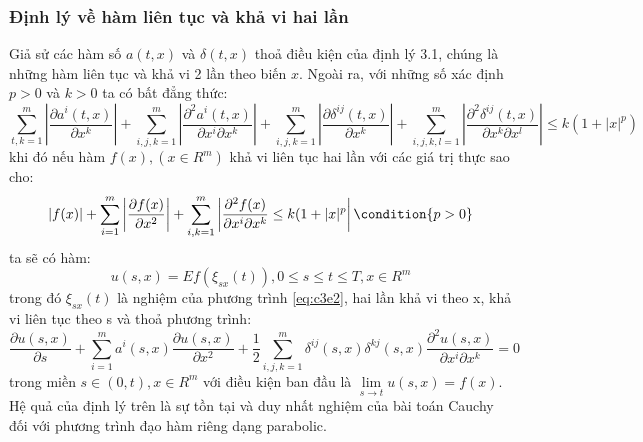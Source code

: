 \documentclass[a4paper]{article}
\numberwithin{equation}{section}
\begin{document}
\subsubsection{Định lý về hàm liên tục và khả vi hai lần}
Giả sử các hàm số $a(t,x)$ và $\delta(t,x)$ thoả điều kiện của định lý 3.1, chúng là những hàm liên tục và khả vi 2 lần theo biến $x$. Ngoài ra, với những số xác định $p>0$ và $k>0$ ta có bất đẳng thức:
\begin{dmath*}
	\sum\limits_{t,k=1}^{m}\left|\dfrac{\partial a^i(t,x)}{\partial x^k}\right|+\sum\limits_{i,j,k=1}^{m}\left|\dfrac{\partial^2a^i(t,x)}{\partial x^i\partial x^k}\right|+\sum_{i,j,k=1}^{m}\left|\dfrac{\partial\delta^{ij}(t,x)}{\partial x^k} \right|+\sum_{i,j,k,l=1}^{m}\left|\dfrac{\partial^2\delta^{ij}(t,x)}{\partial x^k\partial x^l} \right|\leq k(1+|x|^p)	
\end{dmath*}
khi đó nếu hàm $f(x),(x\in R^m)$ khả vi liên tục hai lần với các giá trị thực sao cho:
\begin{equation*}
	\left|f(x)\right|+\sum_{i=1}^{m}\left|\dfrac{\partial f(x)}{\partial x^2} \right|+\sum_{i,k=1}^{m}\left|\dfrac{\partial^2f(x)}{\partial x^i \partial x^k}\leq k(1+|x|^p \right| \condition{p>0}
\end{equation*}
ta sẽ có hàm:
\begin{equation*}
	u(s,x)=Ef(\xi_{sx}(t)),0\leq s\leq t \leq T,x\in R^m
\end{equation*}
trong đó $\xi_{sx}(t)$ là nghiệm của phương trình \eqref{eq:c3e2}, hai lần khả vi theo x, khả vi liên tục theo s và thoả phương trình:
\begin{equation*}
	\dfrac{\partial u(s,x)}{\partial s}+\sum_{i=1}^{m}a^i(s,x)\dfrac{\partial u(s,x)}{\partial x^2}+\dfrac{1}{2}\sum_{i,j,k=1}^{m}\delta^{ij}(s,x)\delta^{kj}(s,x)\dfrac{\partial^2u(s,x)}{\partial x^i\partial x^k}=0
\end{equation*}
trong miền $s\in(0,t),x\in R^m$ với điều kiện ban đầu là $\lim\limits_{s\rightarrow t}u(s,x)=f(x)$.\\
Hệ quả của định lý trên là sự tồn tại và duy nhất nghiệm của bài toán Cauchy đối với phương trình đạo hàm riêng dạng parabolic.\\
\end{document}
